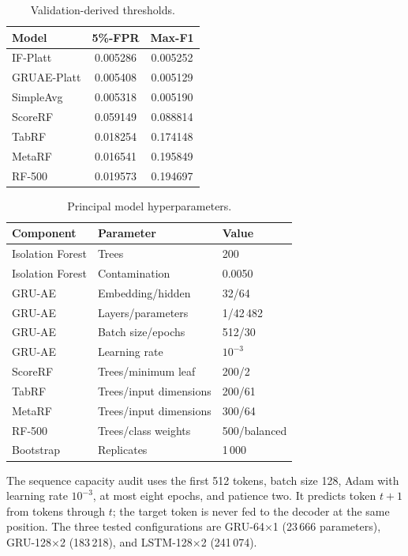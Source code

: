 \documentclass[10pt,journal,compsoc]{IEEEtran}
\begin{document}
\begin{table}[t]
\centering
\caption{Validation-derived thresholds.}
\label{tab:supp_thresholds}
\begin{tabular}{lcc}
\toprule
\textbf{Model} & \textbf{5\%-FPR} & \textbf{Max-F1} \\
\midrule
IF-Platt & 0.005286 & 0.005252 \\
GRUAE-Platt & 0.005408 & 0.005129 \\
SimpleAvg & 0.005318 & 0.005190 \\
ScoreRF & 0.059149 & 0.088814 \\
TabRF & 0.018254 & 0.174148 \\
MetaRF & 0.016541 & 0.195849 \\
RF-500 & 0.019573 & 0.194697 \\
\bottomrule
\end{tabular}
\end{table}

\begin{table}[t]
\centering
\caption{Principal model hyperparameters.}
\label{tab:supp_hyperparameters}
\begin{tabular}{lll}
\toprule
\textbf{Component} & \textbf{Parameter} & \textbf{Value} \\
\midrule
Isolation Forest & Trees & 200 \\
Isolation Forest & Contamination & 0.0050 \\
GRU-AE & Embedding/hidden & 32/64 \\
GRU-AE & Layers/parameters & 1/42\,482 \\
GRU-AE & Batch size/epochs & 512/30 \\
GRU-AE & Learning rate & $10^{-3}$ \\
ScoreRF & Trees/minimum leaf & 200/2 \\
TabRF & Trees/input dimensions & 200/61 \\
MetaRF & Trees/input dimensions & 300/64 \\
RF-500 & Trees/class weights & 500/balanced \\
Bootstrap & Replicates & 1\,000 \\
\bottomrule
\end{tabular}
\end{table}

The sequence capacity audit uses the first 512 tokens, batch size 128, Adam
with learning rate $10^{-3}$, at most eight epochs, and patience two. It
predicts token $t+1$ from tokens through $t$; the target token is never fed to
the decoder at the same position. The three tested configurations are
GRU-64$\times$1 (23\,666 parameters), GRU-128$\times$2 (183\,218), and
LSTM-128$\times$2 (241\,074).
\end{document}
